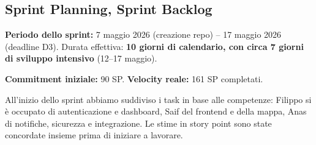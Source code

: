 \documentclass[11pt,a4paper]{article}
\begin{document}
  \subsection{Sprint Planning, Sprint Backlog}
  \textbf{Periodo dello sprint:} 7 maggio 2026 (creazione repo) -- 17 maggio 2026 (deadline D3).
  Durata effettiva: \textbf{10 giorni di calendario, con circa 7 giorni di sviluppo intensivo}
  (12--17 maggio).

  \textbf{Commitment iniziale:} 90 SP. \textbf{Velocity reale:} 161 SP completati.

  All'inizio dello sprint abbiamo suddiviso i task in base alle competenze: Filippo si \`{e}
  occupato di autenticazione e dashboard, Saif del frontend e della mappa, Anas di notifiche,
  sicurezza e integrazione. Le stime in story point sono state concordate insieme prima di
  iniziare a lavorare.
\end{document}

